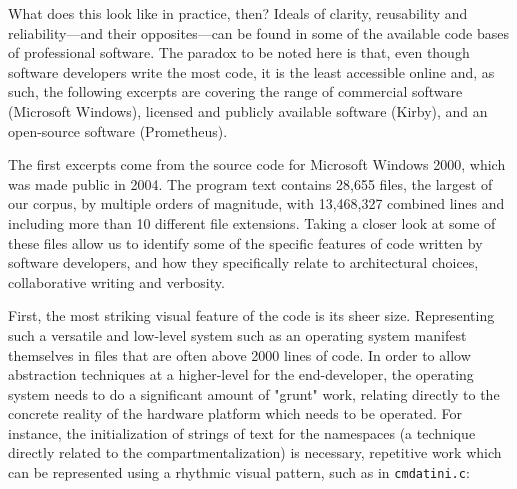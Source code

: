 \vspace*{1\baselineskip}

What does this look like in practice, then? Ideals of clarity, reusability and reliability—and their opposites—can be found in some of the available code bases of professional software. The paradox to be noted here is that, even though software developers write the most code, it is the least accessible online and, as such, the following excerpts are covering the range of commercial software (Microsoft Windows), licensed and publicly available software (Kirby), and an open-source software (Prometheus).

The first excerpts come from the source code for Microsoft Windows 2000, which was made public in 2004. The program text contains  28,655 files, the largest of our  corpus, by multiple orders of magnitude, with 13,468,327 combined lines and including more than 10 different file extensions. Taking a closer look at some of these files allow us to identify some of the specific features of code written by software developers, and how they specifically relate to architectural choices, collaborative writing and verbosity.

First, the most striking visual feature of the code is its sheer size. Representing such a versatile and low-level system such as an operating system manifest themselves in files that are often above 2000 lines of code. In order to allow abstraction techniques at a higher-level for the end-developer, the operating system needs to do a significant amount of "grunt" work, relating directly to the concrete reality of the hardware platform which needs to be operated. For instance, the initialization of strings of text for the namespaces (a technique directly related to the compartmentalization) is necessary, repetitive work which can be represented using a rhythmic visual pattern, such as in \lstinline{cmdatini.c}:


